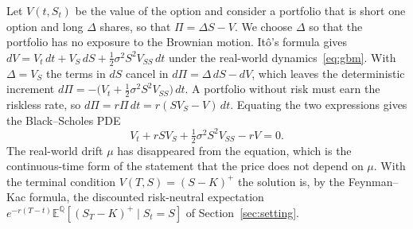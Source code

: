Let $V(t,S_t)$ be the value of the option and consider a portfolio that is short one option and long $\Delta$ shares, so that $\Pi=\Delta S-V$.
We choose $\Delta$ so that the portfolio has no exposure to the Brownian motion.
It\^o's formula gives $dV=V_t\,dt+V_S\,dS+\tfrac12\sigma^2S^2V_{SS}\,dt$ under the real-world dynamics~\eqref{eq:gbm}.
With $\Delta=V_S$ the terms in $dS$ cancel in $d\Pi=\Delta\,dS-dV$, which leaves the deterministic increment $d\Pi=-\big(V_t+\tfrac12\sigma^2S^2V_{SS}\big)\,dt$.
A portfolio without risk must earn the riskless rate, so $d\Pi=r\Pi\,dt=r(SV_S-V)\,dt$.
Equating the two expressions gives the Black--Scholes PDE
\begin{equation}\label{eq:bspde}
 V_t+rSV_S+\tfrac12\sigma^2S^2V_{SS}-rV=0 .
\end{equation}
The real-world drift $\mu$ has disappeared from the equation, which is the continuous-time form of the statement that the price does not depend on $\mu$.
With the terminal condition $V(T,S)=(S-K)^+$ the solution is, by the Feynman--Kac formula, the discounted risk-neutral expectation $e^{-r(T-t)}\mathbb E^{\mathbb Q}[(S_T-K)^+\mid S_t=S]$ of Section~\ref{sec:setting}.
